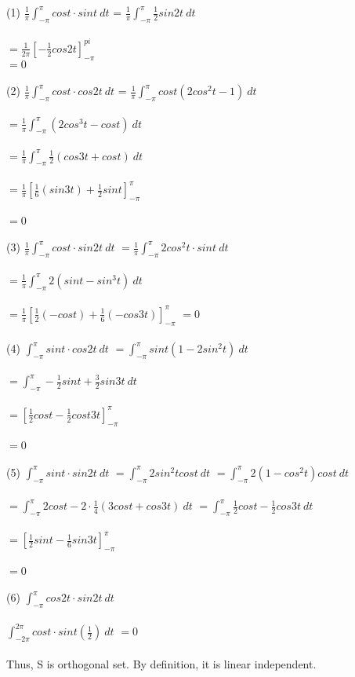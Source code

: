 \documentclass[letterpaper,12pt]{article}
\theoremstyle{definition}
\begin{document}
\begin{enumerate}
(1)
$\frac{1}{\pi}\int_{-\pi}^{\pi} cost \cdot sint \ dt $ = $\frac{1}{\pi}\int_{-\pi}^{\pi} \frac{1}{2} sin2t \ dt $ 
\\
\\
$=\frac{1}{2\pi}[-\frac{1}{2} cos2t]_{-\pi}^{pi}$
\\
$=0$
\\
\\
(2)
$\frac{1}{\pi}\int_{-\pi}^{\pi} cost \cdot cos2t \ dt $ = $\frac{1}{\pi}\int_{-\pi}^{\pi} cost (2cos^2t-1) \ dt $
\\
\\
$=\frac{1}{\pi}\int_{-\pi}^{\pi} (2cos^3t-cost) \ dt $
\\
\\
$=\frac{1}{\pi}\int_{-\pi}^{\pi} \frac{1}{2}(cos3t+cost) \ dt $
\\
\\
$=\frac{1}{\pi}[\frac{1}{6}(sin3t)+\frac{1}{2}sint]_{-\pi}^{\pi} $
\\
\\
$=0$
\\
\\
(3)
$\frac{1}{\pi}\int_{-\pi}^{\pi} cost \cdot sin2t \ dt $ 
$=\frac{1}{\pi}\int_{-\pi}^{\pi} 2cos^2t \cdot sint \ dt $ 
\\
\\
$=\frac{1}{\pi}\int_{-\pi}^{\pi} 2(sint - sin^3t) \ dt $ 
\\
\\
$=\frac{1}{\pi}[\frac{1}{2}(-cost)+\frac{1}{6}(-cos3t)]_{-\pi}^{\pi} $ 
$=0$
\\
\\
(4)
$\int_{-\pi}^{\pi} sint \cdot cos2t \ dt $ 
$=\int_{-\pi}^{\pi} sint(1-2sin^2t) \ dt $ 
\\
\\
$=\int_{-\pi}^{\pi} -\frac{1}{2}sint + \frac{3}{2}sin3t \ dt $ 
\\
\\
$=[\frac{1}{2}cost - \frac{1}{2}cost3t]_{-\pi}^{\pi} $
\\
\\
$=0$
\\
\\
(5)
$\int_{-\pi}^{\pi} sint \cdot sin2t \ dt $ 
$=\int_{-\pi}^{\pi} 2sin^2t cost \ dt $ 
$=\int_{-\pi}^{\pi} 2(1-cos^2t)cost \ dt $ 
\\
\\
$=\int_{-\pi}^{\pi} 2cost - 2 \cdot \frac{1}{4}(3cost + cos3t) \ dt $ 
$=\int_{-\pi}^{\pi} \frac{1}{2}cost - \frac{1}{2}cos3t \ dt $ 
\\
\\
$=[\frac{1}{2}sint-\frac{1}{6}sin3t]_{-\pi}^{\pi}$
\\
\\
$=0$
\\
\\
(6)
$\int_{-\pi}^{\pi} cos2t \cdot sin2t \ dt $
\\
\\
$\int_{-2\pi}^{2\pi} cost \cdot sint (\frac{1}{2}) \ dt $
$=0$
\\
\\
Thus, S is orthogonal set. By definition, it is linear independent.
\\


\end{enumerate}
\end{document}

